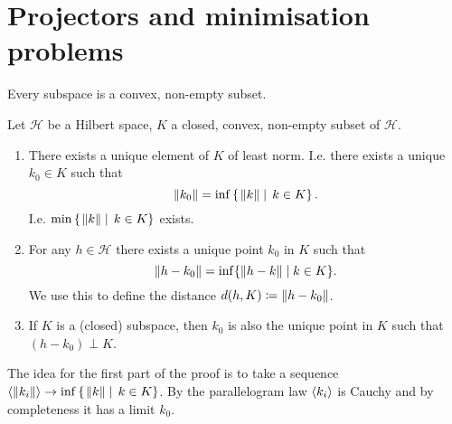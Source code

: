 \section{Projectors and minimisation problems}
Every subspace is a convex, non-empty subset.
\begin{theorem}
Let $\mathcal{H}$ be a Hilbert space, $K$ a closed, convex, non-empty subset of $\mathcal{H}$.
\begin{enumerate}
\item There exists a unique element of $K$ of least norm. I.e. there exists a unique $k_0\in K$ such that
\[ \lVert k_0\rVert = \inf\left\{\left. \lVert k\rVert \;\right|\; k\in K \right\}. \]
I.e. $\min\left\{\left. \lVert k\rVert \;\right|\; k\in K \right\}$ exists.
\item For any $h\in\mathcal{H}$ there exists a unique point $k_0$ in $K$ such that
\[ \lVert h-k_0\rVert = \inf\{\lVert h-k\rVert\;|\; k\in K\}. \]
We use this to define the distance $d(h,K) \coloneqq \lVert h-k_0\rVert$.
\item If $K$ is a (closed) subspace, then $k_0$ is also the unique point in $K$ such that $(h-k_0)\perp K$.
\end{enumerate}
\end{theorem}
The idea for the first part of the proof is to take a sequence $\langle \lVert k_i\rVert \rangle\to \inf\left\{\left. \lVert k\rVert \;\right|\; k\in K \right\}$. By the parallelogram law $\langle k_i \rangle$ is Cauchy and by completeness it has a limit $k_0$.
